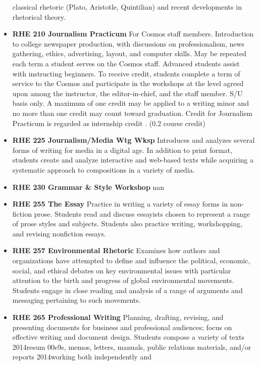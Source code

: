 \documentclass[
  letterpaper,
]{scrbook}
\begin{document}
\begin{itemize}
  classical rhetoric (Plato, Aristotle, Quintilian) and recent
  developments in rhetorical theory.\\
\item
  \textbf{RHE 210 Journalism Practicum} For Cosmos staff members.
  Introduction to college newspaper production, with discussions on
  professionalism, news gathering, ethics, advertising, layout, and
  computer skills. May be repeated each term a student serves on the
  Cosmos staff. Advanced students assist with instructing beginners. To
  receive credit, students complete a term of service to the Cosmos and
  participate in the workshops at the level agreed upon among the
  instructor, the editor-in-chief, and the staff member. S/U basis only.
  A maximum of one credit may be applied to a writing minor and no more
  than one credit may count toward graduation. Credit for Journalism
  Practicum is regarded as internship credit . (0.2 course credit)
\item
  \textbf{RHE 225 Journalism/Media Wtg Wksp} Introduces and analyzes
  several forms of writing for media in a digital age. In addition to
  print format, students create and analyze interactive and web-based
  texts while acquiring a systematic approach to compositions in a
  variety of media.\\
\item
  \textbf{RHE 230 Grammar \& Style Workshop} nan
\item
  \textbf{RHE 255 The Essay} Practice in writing a variety of essay
  forms in non-fiction prose. Students read and discuss essayists chosen
  to represent a range of prose styles and subjects. Students also
  practice writing, workshopping, and revising nonfiction essays.\\
\item
  \textbf{RHE 257 Environmental Rhetoric} Examines how authors and
  organizations have attempted to define and influence the political,
  economic, social, and ethical debates on key environmental issues with
  particular attention to the birth and progress of global environmental
  movements. Students engage in close reading and analysis of a range of
  arguments and messaging pertaining to such movements.
\item
  \textbf{RHE 265 Professional Writing} Planning, drafting, revising,
  and presenting documents for business and professional audiences;
  focus on effective writing and document design. Students compose a
  variety of texts 2014resum 00e9s, memos, letters, manuals, public
  relations materials, and/or reports 2014working both independently and

\end{itemize}
\end{document}
